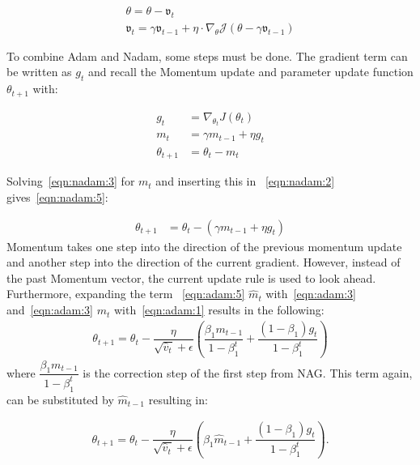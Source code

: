 \begin{align}
    \theta = \theta - \mathfrak{v}_t \label{eqn:nag:1}\\
    \mathfrak{v}_t = \gamma\mathfrak{v}_{t-1} + \eta\cdot\nabla_\theta\mathcal{J}(\theta-\gamma\mathfrak{v}_{t-1})
\label{eqn:nag:2}
\end{align}

To combine \gls{Adam} and \gls{Nadam}, some steps must be done.
The gradient term can be written as $g_t$ and recall the Momentum update and parameter update function $\theta_{t+1}$
with:

\begin{align}
    g_t &= \nabla_{\theta_t}J(\theta_t) \label{eqn:nadam:1} \\
    m_t &= \gamma m_{t-1} + \eta g_t \label{eqn:nadam:2}\\
    \theta_{t+1} &= \theta_t - m_t \label{eqn:nadam:3}
\end{align}

Solving~\ref{eqn:nadam:3} for $m_t$ and inserting this in ~\ref{eqn:nadam:2} gives~\ref{eqn:nadam:5}:

\begin{align}
    \theta_{t+1} &= \theta_t - (\gamma m_{t-1} + \eta g_t) \label{eqn:nadam:5}
\end{align}
Momentum takes one step into the direction of the previous momentum update and another step into the direction of the
current
gradient.
However, instead of the past Momentum vector, the current update rule is used to look ahead.
Furthermore, expanding the term ~\ref{eqn:adam:5} $\hat{m}_t$ with~\ref{eqn:adam:3} and~\ref{eqn:adam:3} $m_t$
with~\ref{eqn:adam:1}
results in the following:
\begin{align}
    \theta_{t+1} = \theta_{t} - \dfrac{\eta}{\sqrt{\hat{v}_t} + \epsilon} (\dfrac{\beta_1 m_{t-1}}{1 - \beta^t_1} +
\dfrac{(1 - \beta_1) g_t}{1 - \beta^t_1})
    \label{eqn:nadam:6}
\end{align}
where $\dfrac{\beta_1 m_{t-1}}{1 - \beta^t_1}$ is the correction step of the first step from NAG.
This term again, can be substituted by $\hat{m}_{t-1}$ resulting in:

\begin{align}
    \theta_{t+1} = \theta_{t} - \dfrac{\eta}{\sqrt{\hat{v}_t} + \epsilon} (\beta_1 \hat{m}_{t-1} + \dfrac{(1 -
\beta_1) g_t}{1 - \beta^t_1})
    \label{eqn:nadam:7}.
\end{align}

